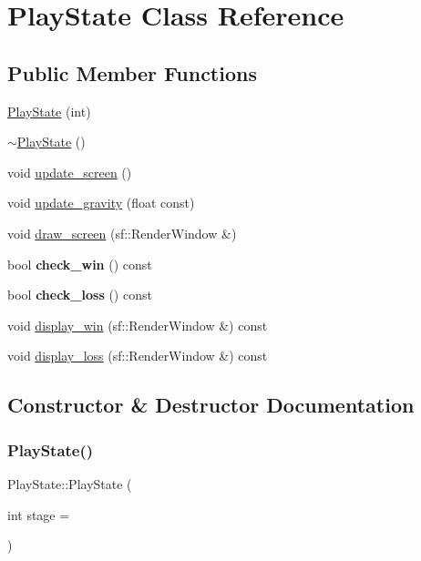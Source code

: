 \hypertarget{classPlayState}{}\section{Play\+State Class Reference}
\label{classPlayState}
\subsection*{Public Member Functions}
\begin{DoxyCompactItemize}
\item 
\hyperlink{classPlayState_a14935ac4ff7ff89dc34c8fa1b01b9a07}{Play\+State} (int)
\item 
\hyperlink{classPlayState_a2d9eafdd1495faf454b1350451b9d22f}{$\sim$\+Play\+State} ()
\item 
void \hyperlink{classPlayState_af27c539c003adda5ca10736ef8d2a9b9}{update\+\_\+screen} ()
\item 
void \hyperlink{classPlayState_a493525123b54430675cd78747aee4571}{update\+\_\+gravity} (float const)
\item 
void \hyperlink{classPlayState_aaa2a573ca80d8625e9580726cd501a34}{draw\+\_\+screen} (sf\+::\+Render\+Window \&)
\item 
\mbox{\label{classPlayState_a73b5e20c0c5fd86ef4f97891990004de}} 
bool {\bfseries check\+\_\+win} () const
\item 
\mbox{\label{classPlayState_a1540cc8989025569e24d73977b13983d}} 
bool {\bfseries check\+\_\+loss} () const
\item 
void \hyperlink{classPlayState_abc63c240c1f1ceb026e2ebf4aba45164}{display\+\_\+win} (sf\+::\+Render\+Window \&) const
\item 
void \hyperlink{classPlayState_a7d1b378f21f1a42beea2382397c08916}{display\+\_\+loss} (sf\+::\+Render\+Window \&) const
\end{DoxyCompactItemize}


\subsection{Constructor \& Destructor Documentation}
\mbox{\label{classPlayState_a14935ac4ff7ff89dc34c8fa1b01b9a07}} 
\subsubsection{\texorpdfstring{Play\+State()}{PlayState()}}
{\footnotesize\ttfamily Play\+State\+::\+Play\+State (\begin{DoxyParamCaption}\item[{int}]{stage = {} }\end{DoxyParamCaption})}


